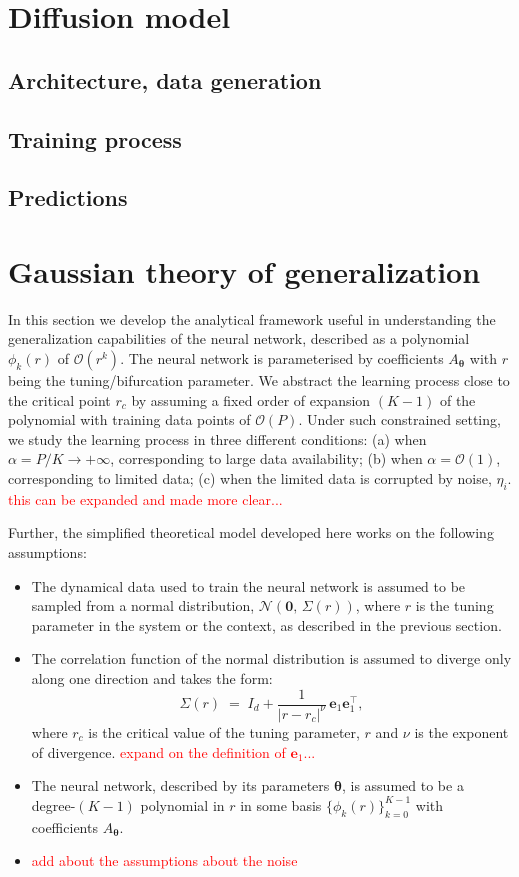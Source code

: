 \documentclass[11pt,a4paper]{article}
\theoremstyle{remark}
\newcommand{\btheta}{\boldsymbol{\theta}}
\newcommand{\be}{\mathbf{e}}
\newcommand{\N}{\mathcal{N}}
\newcommand{\Th}{{\btheta}}
\def\sgp#1{{\sf\textcolor{red}{#1}}}
\begin{document}
\begin{onehalfspace}
\section{Diffusion model}
\subsection{Architecture, data generation}
\subsection{Training process}
\subsection{Predictions}

\section{Gaussian theory of generalization}
\label{sec:toy}

In this section we develop the analytical framework useful in understanding the generalization capabilities of the neural network, described as a polynomial $\phi_k(r)$ of $\mathcal{O}(r^k)$. The neural network is parameterised by coefficients $A_{\Th}$ with $r$ being the tuning/bifurcation parameter. We abstract the learning process close to the critical point $r_c$ by assuming a fixed order of expansion $(K-1)$ of the polynomial with training data points of $\mathcal{O}(P)$. Under such constrained setting, we study the learning process in three different conditions: (a) when $\alpha = P/K \rightarrow + \infty$, corresponding to large data availability; (b) when $\alpha = \mathcal{O}(1)$, corresponding to limited data; (c) when the limited data is corrupted by noise, $\eta_i$. \sgp{this can be expanded and made more clear...}

Further, the simplified theoretical model developed here works on the following assumptions:
\begin{itemize}
    \item The dynamical data used to train the neural network is assumed to be sampled from a normal distribution, $\N \left(\mathbf{0},\, \Sigma(r)\right)$, where $r$ is the tuning parameter in the system or the context, as described in the previous section.
    \item The correlation function of the normal distribution is assumed to diverge only along one direction and takes the form:
    \begin{equation}\label{eq:corr_matrix}
        \Sigma(r) \;=\; I_d + \frac{1}{|r-r_c|^{\nu}} \, \be_1 \be_1^\top,
    \end{equation}
    where $r_c$ is the critical value of the tuning parameter, $r$ and $\nu$ is the exponent of divergence. \sgp{expand on the definition of $\be_1$...}
    \item The neural network, described by its parameters $\Th$, is assumed to be a degree-$(K-1)$ polynomial in $r$ in some basis $\{\phi_k(r)\}_{k=0}^{K-1}$ with coefficients $A_{\Th}$.
    \item \sgp{add about the assumptions about the noise}
\end{itemize}


\end{onehalfspace}
\end{document}
